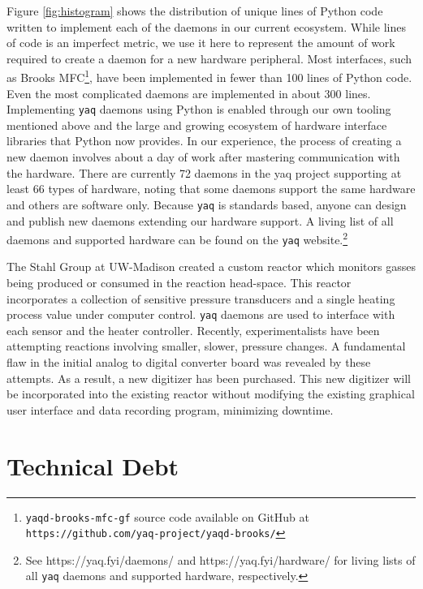 \documentclass[aip, amsmath, amssymb, reprint,]{revtex4-2}
\newcommand\yaq{\texttt{yaq}}
\begin{document}
Figure \ref{fig:histogram} shows the distribution of unique lines of Python code written to implement each of the daemons in our current ecosystem.
While lines of code is an imperfect metric, we use it here to represent the amount of work required to create a daemon for a new hardware peripheral.
Most interfaces, such as Brooks MFC\footnote{\texttt{yaqd-brooks-mfc-gf} source code available on GitHub at \texttt{https://github.com/yaq-project/yaqd-brooks/}}, have been implemented in fewer than 100 lines of Python code.
Even the most complicated daemons are implemented in about 300 lines.
Implementing \yaq{} daemons using Python is enabled through our own tooling mentioned above and the large and growing ecosystem of hardware interface libraries that Python now provides\cite{pyserial, pyusb, pyvisa, pymodbus}.
In our experience, the process of creating a new daemon involves about a day of work after mastering communication with the hardware.
There are currently 72 daemons in the yaq project supporting at least 66 types of hardware, noting that some daemons support the same hardware and others are software only.
Because \yaq{} is standards based, anyone can design and publish new daemons extending our hardware support.
A living list of all daemons and supported hardware can be found on the \yaq{} website.\footnote{See https://yaq.fyi/daemons/ and https://yaq.fyi/hardware/ for living lists of all \yaq{} daemons and supported hardware, respectively.}

The Stahl Group at UW-Madison created a custom reactor which monitors gasses being produced or consumed in the reaction head-space.  \cite{SalazarChaseA2021a}
This reactor incorporates a collection of sensitive pressure transducers and a single heating process value under computer control.
\yaq{} daemons are used to interface with each sensor and the heater controller.
Recently, experimentalists have been attempting reactions involving smaller, slower, pressure changes.
A fundamental flaw in the initial analog to digital converter board was revealed by these attempts.
As a result, a new digitizer has been purchased.
This new digitizer will be incorporated into the existing reactor without modifying the existing graphical user interface and data recording program, minimizing downtime.

\section{Technical Debt}
\end{document}
